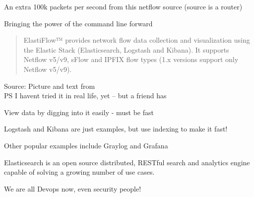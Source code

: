 \documentclass[Screen16to9,17pt]{foils}
\begin{document}





\centerline{An extra 100k packets per second from this netflow source (source is a router)}




\centerline{Bringing the power of the command line forward}




\begin{quote}
  ElastiFlow™ provides network flow data collection and visualization using the Elastic Stack (Elasticsearch, Logstash and Kibana). It supports Netflow v5/v9, sFlow and IPFIX flow types (1.x versions support only Netflow v5/v9).
\end{quote}
Source: Picture and text from  \\
PS I havent tried it in real life, yet -- but a friend has







\begin{list1}
\item View data by digging into it easily - must be fast
\item Logstash and Kibana are just examples, but use indexing to make it fast!
\item Other popular examples include Graylog and Grafana
\end{list1}



Elasticsearch is an open source distributed, RESTful search and analytics engine capable of solving a growing number of use cases.


\vskip 1cm
\centerline{We are all Devops now, even security people!}
\end{document}
